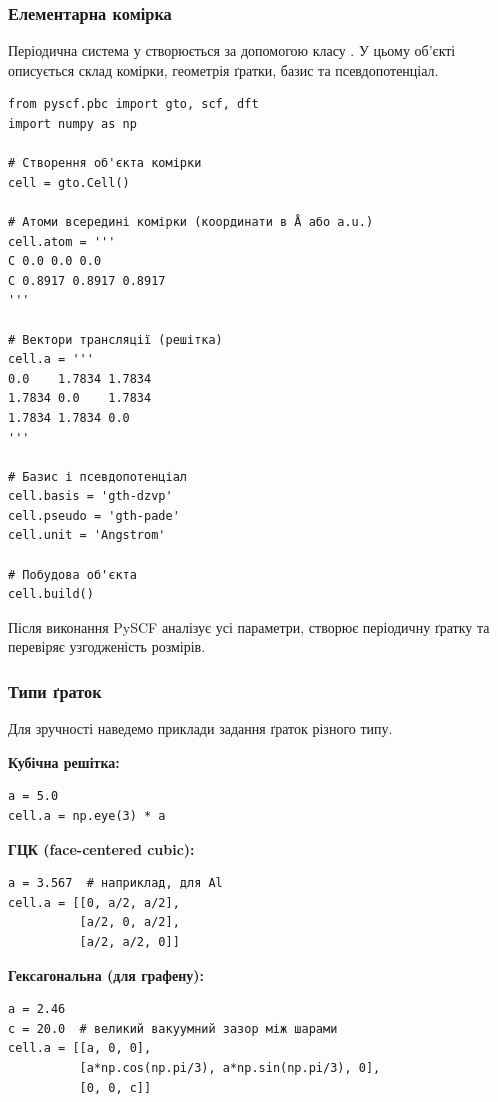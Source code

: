 \subsubsection{Елементарна комірка}

Періодична система у  створюється за допомогою класу .
У цьому об’єкті описується склад комірки, геометрія ґратки, базис та псевдопотенціал.

\begin{verbatim}
from pyscf.pbc import gto, scf, dft
import numpy as np

# Створення об'єкта комірки
cell = gto.Cell()

# Атоми всередині комірки (координати в Å або a.u.)
cell.atom = '''
C 0.0 0.0 0.0
C 0.8917 0.8917 0.8917
'''

# Вектори трансляції (решітка)
cell.a = '''
0.0    1.7834 1.7834
1.7834 0.0    1.7834
1.7834 1.7834 0.0
'''

# Базис і псевдопотенціал
cell.basis = 'gth-dzvp'
cell.pseudo = 'gth-pade'
cell.unit = 'Angstrom'

# Побудова об'єкта
cell.build()
\end{verbatim}

Після виконання  PySCF аналізує усі параметри, створює періодичну ґратку та перевіряє узгодженість розмірів.

\subsubsection{Типи ґраток}

Для зручності наведемо приклади задання ґраток різного типу.

\textbf{Кубічна решітка:}
\begin{verbatim}
a = 5.0
cell.a = np.eye(3) * a
\end{verbatim}

\textbf{ГЦК (face-centered cubic):}
\begin{verbatim}
a = 3.567  # наприклад, для Al
cell.a = [[0, a/2, a/2],
          [a/2, 0, a/2],
          [a/2, a/2, 0]]
\end{verbatim}

\textbf{Гексагональна (для графену):}
\begin{verbatim}
a = 2.46
c = 20.0  # великий вакуумний зазор між шарами
cell.a = [[a, 0, 0],
          [a*np.cos(np.pi/3), a*np.sin(np.pi/3), 0],
          [0, 0, c]]
\end{verbatim}

